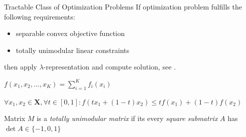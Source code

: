 \documentclass[presentation,professionalfonts]{beamer}
\begin{document}
\begin{frame}{Tractable Class of Optimization Problems}
  If optimization problem fulfills the following requirements:
  \begin{itemize}
  \item separable convex objective function
  \item totally unimodular linear constraints
  \end{itemize}
  then apply \(\lambda\)-representation and compute solution, see \textcite{Meyer1976}.

  \pause
  \begin{definition}
    \begin{center}
      \(f(x_1, x_2, \dots, x_K) = \sum_{i=1}^K f_i(x_i)\)
    \end{center}
  \end{definition}
  \begin{definition}
    \(\forall x_1, x_2 \in\bm{X},\forall t\in[0, 1]: f(tx_1 + (1 - t)x_2)\leq tf(x_1) + (1 - t)f(x_2)\)
  \end{definition}
  \begin{definition}
    Matrix \(M\) is a \emph{totally unimodular matrix} if its
    every \emph{square submatrix} \(A\) has \(\det A\in \{-1, 0,
    1\}\)    
    \end{definition}
\end{frame}

\newcommand{\flambdas}{\lambda^{k, 0}_{i, j} + \lambda^{k, 1}_{i, j}}
\newcommand{\fsmember}{\flambdas M^{\left(c^k_{i, j} + e^k_{i, j}\right)}}
\newcommand{\rplus}{\mathbf{R}^{+}}

\end{document}
